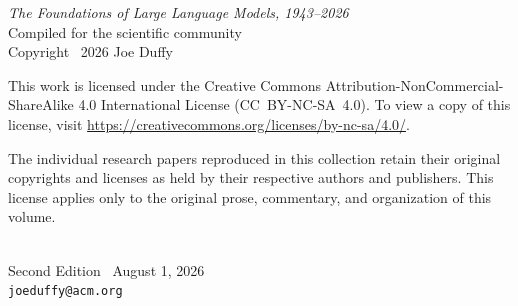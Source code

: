 \thispagestyle{empty}
\vspace*{\fill}
\begin{center}
\footnotesize
\textit{The Foundations of Large Language Models, 1943--2026}\\[4pt]
Compiled for the scientific community\\[10pt]
Copyright \textcopyright\ 2026 Joe Duffy\\[12pt]
\begin{minipage}{0.72\textwidth}
\centering
This work is licensed under the Creative Commons
Attribution-NonCommercial-ShareAlike 4.0 International License
(CC~BY-NC-SA~4.0). To view a copy of this license, visit
\url{https://creativecommons.org/licenses/by-nc-sa/4.0/}.

\vspace{8pt}
The individual research papers reproduced in this collection retain
their original copyrights and licenses as held by their respective
authors and publishers. This license applies only to the original
prose, commentary, and organization of this volume.
\end{minipage}\\[18pt]
Second Edition \textperiodcentered\ August 1, 2026\\[4pt]
\texttt{joeduffy@acm.org}
\end{center}
\vspace*{\fill}
